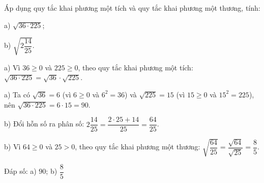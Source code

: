\begin{problem}[9DS-CAN-021]
Áp dụng quy tắc khai phương một tích và quy tắc khai phương một thương, tính:

a) $\sqrt{36 \cdot 225}$;

b) $\sqrt{2\dfrac{14}{25}}$.

\begin{solution}
a) Vì $36 \geq 0$ và $225 \geq 0$, theo quy tắc khai phương một tích: $\sqrt{36 \cdot 225} = \sqrt{36} \cdot \sqrt{225}$.

a) Ta có $\sqrt{36} = 6$ (vì $6 \geq 0$ và $6^2 = 36$) và $\sqrt{225} = 15$ (vì $15 \geq 0$ và $15^2 = 225$), nên $\sqrt{36 \cdot 225} = 6 \cdot 15 = 90$.

b) Đổi hỗn số ra phân số: $2\dfrac{14}{25} = \dfrac{2 \cdot 25 + 14}{25} = \dfrac{64}{25}$.

b) Vì $64 \geq 0$ và $25 > 0$, theo quy tắc khai phương một thương: $\sqrt{\dfrac{64}{25}} = \dfrac{\sqrt{64}}{\sqrt{25}} = \dfrac{8}{5}$.

Đáp số: a) $\boxed{90}$; b) $\boxed{\dfrac{8}{5}}$
\end{solution}
\end{problem}

